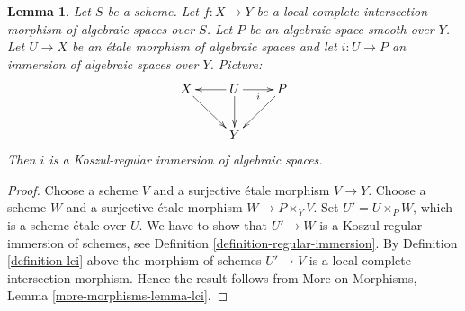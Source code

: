\documentclass[10pt,a4paper]{amsart}
\theoremstyle{plain}
\newtheorem{lemma}[subsection]{Lemma}
\theoremstyle{definition}
\theoremstyle{remark}
\numberwithin{equation}{subsection}
\begin{document}
\begin{lemma}
\label{lemma-lci}
Let $S$ be a scheme.
Let $f : X \to Y$ be a local complete intersection morphism
of algebraic spaces over $S$.
Let $P$ be an algebraic space smooth over $Y$.
Let $U \to X$ be an \'etale morphism of algebraic spaces
and let $i : U \to P$ an immersion of algebraic spaces over $Y$.
Picture:
$$
\xymatrix{
X \ar[rd] & U \ar[l] \ar[d] \ar[r]_i & P \ar[ld] \\
& Y
}
$$
Then $i$ is a Koszul-regular immersion of algebraic spaces.
\end{lemma}

\begin{proof}
Choose a scheme $V$ and a surjective \'etale morphism $V \to Y$.
Choose a scheme $W$ and a surjective \'etale morphism $W \to P \times_Y V$.
Set $U' = U \times_P W$, which is a scheme \'etale over $U$.
We have to show that $U' \to W$ is a Koszul-regular immersion of
schemes, see
Definition \ref{definition-regular-immersion}.
By
Definition \ref{definition-lci}
above the morphism of schemes $U' \to V$ is a local complete intersection
morphism. Hence the result follows from
More on Morphisms, Lemma \ref{more-morphisms-lemma-lci}.
\end{proof}
\end{document}
